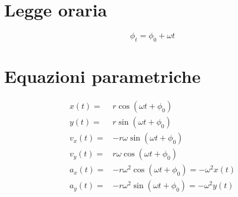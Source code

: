 \section{Legge oraria}
\begin{equation*}
\phi_t=\phi_0+\omega t
\end{equation*}
\section{Equazioni parametriche}
\begin{align*}
x(t)=&r\cos(\omega t+\phi_0)\\
y(t)=&r\sin(\omega t+\phi_0)\\
v_x(t)=&-r\omega\sin(\omega t+\phi_0)\\
v_y(t)=&r\omega\cos(\omega t+\phi_0)\\
a_x(t)=&-r\omega^2\cos(\omega t+\phi_0)=-\omega^2 x(t)\\
a_y(t)=&-r\omega^2\sin(\omega t+\phi_0)=-\omega^2 y(t)\\
\end{align*}